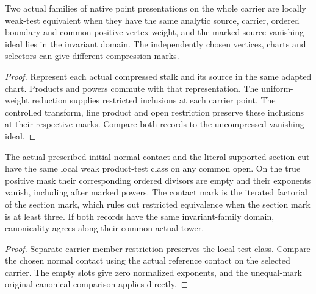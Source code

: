 \begin{theorem}
\label{hir:g1-independent-uniform-native-class}
\leanok
Two actual families of native point presentations on the whole
carrier are locally weak-test equivalent when they have the same
analytic source, carrier, ordered boundary and common positive
vertex weight, and the marked source vanishing ideal lies in the
invariant domain. The independently chosen vertices, charts and
selectors can give different compression marks.
\end{theorem}
\begin{proof}
Represent each actual compressed stalk and its source in the same
adapted chart. Products and powers commute with that representation.
The uniform-weight reduction supplies restricted inclusions at each
carrier point. The controlled transform, line product and open
restriction preserve these inclusions at their respective marks.
Compare both records to the uncompressed vanishing ideal.
\end{proof}

\begin{theorem}
\label{hir:g1-initial-selected-normal-section-local-class}
\leanok
The actual prescribed initial normal contact and the literal
supported section cut have the same local weak product-test class
on any common open. On the true positive mask their corresponding
ordered divisors are empty and their exponents vanish, including
after marked powers. The contact mark is the iterated factorial of
the section mark, which rules out restricted equivalence when the
section mark is at least three. If both records have the same
invariant-family domain, canonicality agrees along their common
actual tower.
\end{theorem}
\begin{proof}
Separate-carrier member restriction preserves the local test class.
Compare the chosen normal contact using the actual reference contact
on the selected carrier. The empty slots give zero normalized
exponents, and the unequal-mark original canonical comparison
applies directly.
\end{proof}

